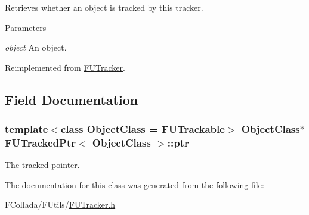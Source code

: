 \label{classFUTrackedPtr_a8715a735d43ad08ecae5b716b3833433}
Retrieves whether an object is tracked by this tracker. 
\begin{DoxyParams}{Parameters}
\item[{\em object}]An object. \end{DoxyParams}


Reimplemented from \hyperlink{classFUTracker_ab58cddea7242921a4b9e6c07dfd64b11}{FUTracker}.



\subsection{Field Documentation}
\hypertarget{classFUTrackedPtr_aa7964388a4365d5823467848dd5de579}{
\subsubsection[{ptr}]{\setlength{\rightskip}{0pt plus 5cm}template$<$class ObjectClass = FUTrackable$>$ ObjectClass$\ast$ {\bf FUTrackedPtr}$<$ ObjectClass $>$::{\bf ptr}}}
\label{classFUTrackedPtr_aa7964388a4365d5823467848dd5de579}
The tracked pointer. 

The documentation for this class was generated from the following file:\begin{DoxyCompactItemize}
\item 
FCollada/FUtils/\hyperlink{FUTracker_8h}{FUTracker.h}\end{DoxyCompactItemize}
